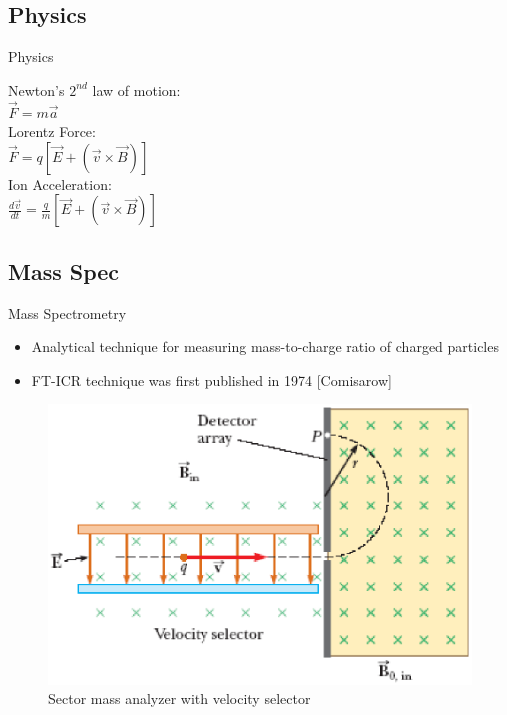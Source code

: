 \documentclass[t,compress,athserif,xcolor=pst,dvips]{beamer}
\begin{document}
	\subsection{Physics}
	\begin{frame}[c]{Physics}
		\begin{center}
			Newton's $2^{nd}$ law of motion: \\[6pt]
			$\vec{F}=m\vec{a}$ \\[10pt] \pause
			Lorentz Force: \\[6pt]
			$\vec{F}=q[\vec{E}+(\vec{v}\times \vec{B})]$ \\[10pt] \pause
			Ion Acceleration: \\[6pt]
			$\frac{d\vec{v}}{dt}=\frac{q}{m}[\vec{E}+(\vec{v}\times \vec{B})]$
		\end{center}
	\end{frame}
	
	\subsection{Mass Spec}
	\begin{frame}[c]{Mass Spectrometry}
		\begin{itemize} \itemsep2pt
			\item Analytical technique for measuring mass-to-charge ratio of charged particles
			\item FT-ICR technique was first published in 1974 [Comisarow]
		\end{itemize} \pause
		\begin{center}
			\begin{figure}
				\includegraphics[scale=.42]{MassSpec.eps}
				\caption{Sector mass analyzer with velocity selector}
			\end{figure}
		\end{center}
	\end{frame}
	
\end{document}
